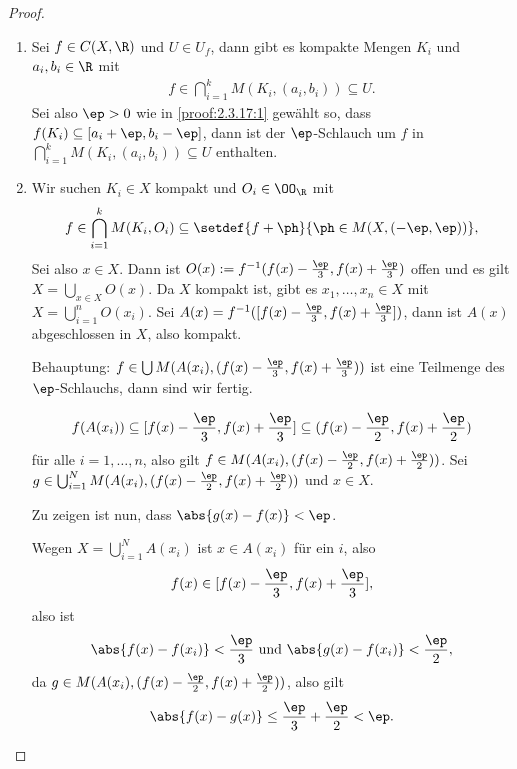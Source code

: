 \begin{proof}
\begin{enumerate}[label=\arabic{*}.)]
\begin{enumerate}[label=(\alph{*})]
  \item Sei $f\in C(X,\R)$ und $U\in U_f$, dann gibt es kompakte Mengen $K_i$
  und $a_i,b_i\in\R$ mit
  \begin{align*}
  f\in\bigcap_{i=1}^k M(K_i,(a_i,b_i))\subseteq U.
  \end{align*}
Sei also $\ep >0$ wie in \ref{proof:2.3.17:1} gewählt so, dass $f(K_i)\subseteq
[a_i+\ep,b_i-\ep]$, dann ist der $\ep$-Schlauch um $f$ in $\bigcap_{i=1}^k
M(K_i,(a_i,b_i))\subseteq U$ enthalten.
\item Wir suchen $K_i\in X$ kompakt und $O_i\in\OO_\R$ mit
\begin{align*}
f\in\bigcap_{i=1}^k M(K_i,O_i) \subseteq \setdef{f+\ph}{\ph\in M(X,(-\ep,\ep))},
\end{align*}
Sei also $x\in X$. Dann ist $O(x) := f^{-1}(f(x)-\frac{\ep}{3},
f(x)+\frac{\ep}{3})$ offen und es gilt $X=\bigcup_{x\in X} O(x)$. Da $X$
kompakt ist, gibt es $x_1,\ldots,x_n\in X$ mit $X=\bigcup_{i=1}^n O(x_i)$. Sei
$A(x) = f^{-1}([f(x)-\frac{\ep}{3}, f(x)+\frac{\ep}{3}])$, dann ist $A(x)$
abgeschlossen in $X$, also kompakt.

Behauptung: $f\in\bigcup M(A(x_i),(f(x)-\frac{\ep}{3}, f(x)+\frac{\ep}{3}))$
ist eine Teilmenge des $\ep$-Schlauchs, dann sind wir fertig.

\begin{align*}
f(A(x_i))\subseteq [f(x)-\frac{\ep}{3}, f(x)+\frac{\ep}{3}] \subseteq
(f(x)-\frac{\ep}{2}, f(x)+\frac{\ep}{2})
\end{align*}
für alle $i=1,\ldots,n$, also gilt $f\in M(A(x_i), (f(x)-\frac{\ep}{2},
f(x)+\frac{\ep}{2}))$. Sei $g\in \bigcup_{i=1}^N M(A(x_i), (f(x)-\frac{\ep}{2},
f(x)+\frac{\ep}{2}))$ und $x\in X$.

Zu zeigen ist nun, dass $\abs{g(x)-f(x)}<\ep$.

Wegen $X=\bigcup_{i=1}^N A(x_i)$ ist $x\in A(x_i)$ für ein $i$, also
\begin{align*}
f(x)\in [f(x)-\frac{\ep}{3}, f(x)+\frac{\ep}{3}],
\end{align*}
also ist
\begin{align*}
\abs{f(x)-f(x_i)} < \frac{\ep}{3}\text{ und } \abs{g(x)-f(x_i)} < \frac{\ep}{2},
\end{align*}
da $g\in M(A(x_i), (f(x)-\frac{\ep}{2},
f(x)+\frac{\ep}{2}))$, also gilt
\begin{align*}
\abs{f(x)-g(x)} \le \frac{\ep}{3} + \frac{\ep}{2} < \ep.\qedhere
\end{align*}
\end{enumerate}
\end{enumerate}
\end{proof}

